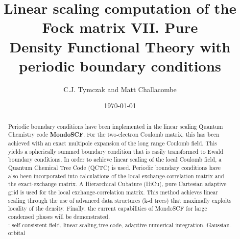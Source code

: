 \commentoutA{\documentclass[prb,aps,twocolumn,showpacs,twocolumngrid,superbib]{revtex4}}
\begin{document}
\date{\today}

\title{Linear scaling computation of the Fock matrix VII. Pure \\ 
       Density Functional Theory with periodic boundary conditions}

\author{C.J. Tymczak and Matt Challacombe}


\begin{abstract}
Periodic boundary conditions have been implemented in the linear scaling
Quantum Chemistry code \textbf{MondoSCF}. For the two-electron Coulomb
matrix, this has been achieved with an exact multipole expansion of
the long range Coulomb field. This yields a spherically summed boundary
condition that is easily transformed to Ewald boundary conditions.
In order to achieve linear scaling of the local Coulomb field, a Quantum
Chemical Tree Code (QCTC) is used. Periodic boundary conditions have
also been incorporated into calculations of the local exchange-correlation
matrix and the exact-exchange matrix. A Hierarchical Cubature (HiCu),
pure Cartesian adaptive grid is used for the local exchange-correlation
matrix. This method achieves linear scaling through the use of advanced
data structures (k-d trees) that maximally exploits locality of the
density. Finally, the current capabilities of MondoSCF for large condensed
phases will be demonstrated.\\[.1cm]
: self-consistent-field, linear-scaling,tree-code, adaptive numerical integration, Gaussian-orbital
\end{abstract}



\maketitle

\end{document}
